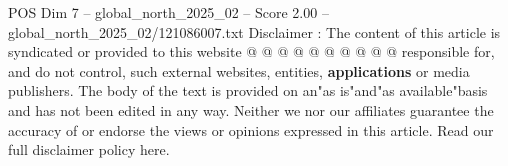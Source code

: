 \begin{textsample}{POS Dim 7 – global\_north\_2025\_02 – Score 2.00 – global\_north\_2025\_02/121086007.txt}
Disclaimer : The content of this article is syndicated or provided to this website @ @ @ @ @ @ @ @ @ @ responsible for, and do not control, such external websites, entities, \textbf{applications} or media publishers.
The body of the text is provided on an"as is"and"as available"basis and has not been edited in any way.
Neither we nor our affiliates guarantee the accuracy of or endorse the views or opinions expressed in this article.
Read our full disclaimer policy here.

\end{textsample}
